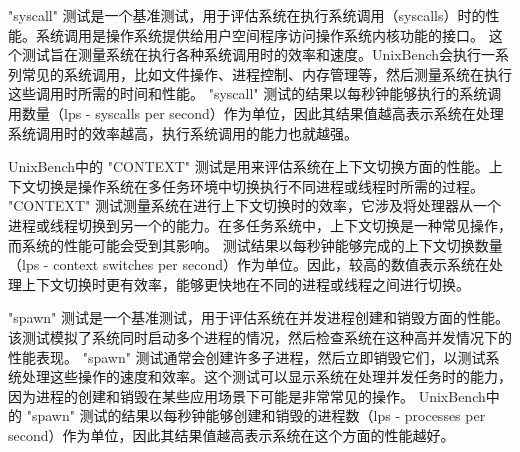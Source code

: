 "syscall" 测试是一个基准测试，用于评估系统在执行系统调用（syscalls）时的性能。系统调用是操作系统提供给用户空间程序访问操作系统内核功能的接口。
这个测试旨在测量系统在执行各种系统调用时的效率和速度。UnixBench会执行一系列常见的系统调用，比如文件操作、进程控制、内存管理等，然后测量系统在执行这些调用时所需的时间和性能。
"syscall" 测试的结果以每秒钟能够执行的系统调用数量（lps - syscalls per second）作为单位，因此其结果值越高表示系统在处理系统调用时的效率越高，执行系统调用的能力也就越强。

UnixBench中的 "CONTEXT" 测试是用来评估系统在上下文切换方面的性能。上下文切换是操作系统在多任务环境中切换执行不同进程或线程时所需的过程。
"CONTEXT" 测试测量系统在进行上下文切换时的效率，它涉及将处理器从一个进程或线程切换到另一个的能力。在多任务系统中，上下文切换是一种常见操作，而系统的性能可能会受到其影响。
测试结果以每秒钟能够完成的上下文切换数量（lps - context switches per second）作为单位。因此，较高的数值表示系统在处理上下文切换时更有效率，能够更快地在不同的进程或线程之间进行切换。

"spawn" 测试是一个基准测试，用于评估系统在并发进程创建和销毁方面的性能。该测试模拟了系统同时启动多个进程的情况，然后检查系统在这种高并发情况下的性能表现。
"spawn" 测试通常会创建许多子进程，然后立即销毁它们，以测试系统处理这些操作的速度和效率。这个测试可以显示系统在处理并发任务时的能力，因为进程的创建和销毁在某些应用场景下可能是非常常见的操作。
UnixBench中的 "spawn" 测试的结果以每秒钟能够创建和销毁的进程数（lps - processes per second）作为单位，因此其结果值越高表示系统在这个方面的性能越好。


